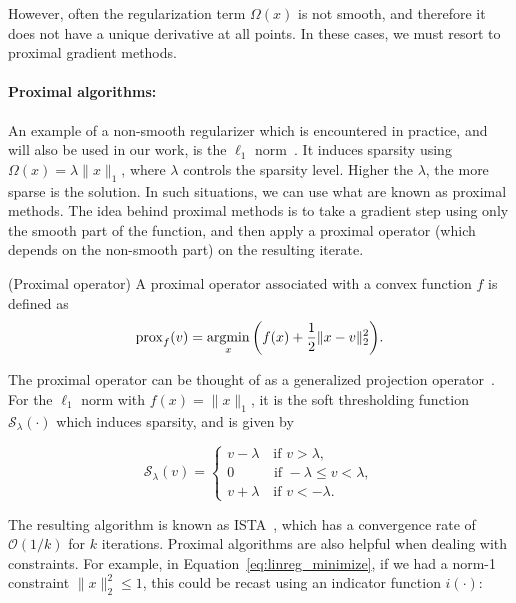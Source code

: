 However, often the regularization term $\Omega(x)$ is not smooth, and therefore it does not have a unique derivative at all points. In these cases, we must resort to proximal gradient methods.

\paragraph{Proximal algorithms: } An example of a non-smooth regularizer which is encountered in practice, and will also be used in our work, is the $\ell_1$ norm~\citep{tibshirani1996regression}. It induces sparsity using $\Omega(x) = \lambda \|x\|_1$, where $\lambda$ controls the sparsity level. Higher the $\lambda$, the more sparse is the solution. In such situations, we can use what are known as proximal methods. The idea behind proximal methods is to take a gradient step using only the smooth part of the function, and then apply a proximal operator (which depends on the non-smooth part) on the resulting iterate. 

\vspace{\parskip}
\begin{definition}{(Proximal operator)}
A proximal operator associated with a convex function $f$ is defined as
\begin{equation}
\mathrm{prox}_f(v) = \mathop{\mathrm{argmin}}_x \bigg( f(x) + \frac{1}{2}\|x - v\|_2^2 \bigg).
\end{equation}
\end{definition}

The proximal operator can be thought of as a generalized projection operator~\citep{parikh2014proximal}. For the $\ell_1$ norm with $f(x)=\|x\|_1$, it is the soft thresholding function $\mathcal{S}_\lambda(\cdot)$ which induces sparsity, and is given by

\begin{equation}
\mathcal{S}_{\lambda}(v) = \begin{cases}
v - \lambda \quad \text{if }  v > \lambda, \\
0 \quad \hspace{22pt} \text{if } -\lambda \leq v < \lambda,\\
v + \lambda \quad \text{if } v < -\lambda.
\end{cases}
\end{equation}

The resulting algorithm is known as \ac{ISTA}~\citep{daubechies2004iterative, bach2012optimization}, which has a convergence rate of $\mathcal{O}(1/k)$ for $k$ iterations. Proximal algorithms are also helpful when dealing with constraints. For example, in Equation~\ref{eq:linreg_minimize}, if we had a norm-1 constraint $\|x\|_2^2 \leq 1$, this could be recast using an indicator function $i(\cdot)$:

